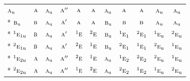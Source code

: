 \documentclass[10pt,a4paper]{article}
\numberwithin{equation}{section}
\newcommand{\irr}[1]{\text{\normalfont\scshape #1}}
\newcommand{\conjpair}[1]{{}^{#1}}
\newcommand{\ptag}[1]{\mathrm{#1}}
\begin{document}
{\begin{longtable}{@{}lcccccccccc@{}}
$\irr{a}_{\ptag{u}}$ & $\irr{a}$ & $\irr{a}_{\ptag{u}}$ & $\irr{a}''$ & $\irr{a}$ & $\irr{a}$ & $\irr{a}_{\ptag{u}}$ & $\irr{a}$ & $\irr{a}$ & $\irr{a}_{\ptag{u}}$ & $\irr{a}_{\ptag{u}}$\\*
$\irr{b}_{\ptag{u}}$ & $\irr{b}$ & $\irr{a}_{\ptag{u}}$ & $\irr{a}'$ & $\irr{a}$ & $\irr{a}$ & $\irr{b}_{\ptag{u}}$ & $\irr{b}$ & $\irr{b}$ & $\irr{a}_{\ptag{u}}$ & $\irr{a}_{\ptag{u}}$\\*
$\conjpair{1}\irr{e}_{1\ptag{u}}$ & $\irr{b}$ & $\irr{a}_{\ptag{u}}$ & $\irr{a}'$ & $\conjpair{1}\irr{e}$ & $\conjpair{2}\irr{e}$ & $\irr{b}_{\ptag{u}}$ & $\conjpair{1}\irr{e}_{1}$ & $\conjpair{2}\irr{e}_{1}$ & $\conjpair{1}\irr{e}_{\ptag{u}}$ & $\conjpair{2}\irr{e}_{\ptag{u}}$\\*
$\conjpair{2}\irr{e}_{1\ptag{u}}$ & $\irr{b}$ & $\irr{a}_{\ptag{u}}$ & $\irr{a}'$ & $\conjpair{2}\irr{e}$ & $\conjpair{1}\irr{e}$ & $\irr{b}_{\ptag{u}}$ & $\conjpair{2}\irr{e}_{1}$ & $\conjpair{1}\irr{e}_{1}$ & $\conjpair{2}\irr{e}_{\ptag{u}}$ & $\conjpair{1}\irr{e}_{\ptag{u}}$\\*
$\conjpair{1}\irr{e}_{2\ptag{u}}$ & $\irr{a}$ & $\irr{a}_{\ptag{u}}$ & $\irr{a}''$ & $\conjpair{2}\irr{e}$ & $\conjpair{1}\irr{e}$ & $\irr{a}_{\ptag{u}}$ & $\conjpair{1}\irr{e}_{2}$ & $\conjpair{2}\irr{e}_{2}$ & $\conjpair{2}\irr{e}_{\ptag{u}}$ & $\conjpair{1}\irr{e}_{\ptag{u}}$\\*
$\conjpair{2}\irr{e}_{2\ptag{u}}$ & $\irr{a}$ & $\irr{a}_{\ptag{u}}$ & $\irr{a}''$ & $\conjpair{1}\irr{e}$ & $\conjpair{2}\irr{e}$ & $\irr{a}_{\ptag{u}}$ & $\conjpair{2}\irr{e}_{2}$ & $\conjpair{1}\irr{e}_{2}$ & $\conjpair{1}\irr{e}_{\ptag{u}}$ & $\conjpair{2}\irr{e}_{\ptag{u}}$\\
\bottomrule\end{longtable}}
\end{document}

